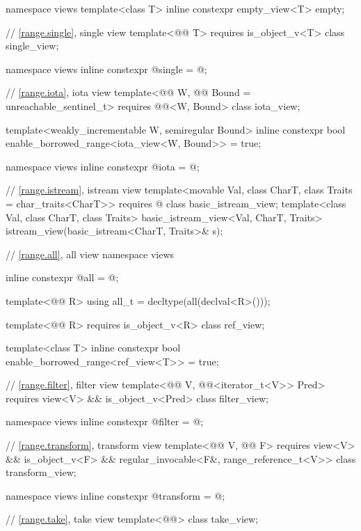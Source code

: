 \begin{codeblock}
{  namespace views {
    template<class T>
      inline constexpr empty_view<T> empty{};
  }

  // \ref{range.single}, single view
  template<@@ T>
    requires is_object_v<T>
  class single_view;

  namespace views { inline constexpr @\unspec@ single = @\unspec@; }

  // \ref{range.iota}, iota view
  template<@@ W, @@ Bound = unreachable_sentinel_t>
    requires @@<W, Bound>
  class iota_view;

  template<weakly_incrementable W, semiregular Bound>
    inline constexpr bool enable_borrowed_range<iota_view<W, Bound>> = true;

  namespace views { inline constexpr @\unspec@ iota = @\unspec@; }

  // \ref{range.istream}, istream view
  template<movable Val, class CharT, class Traits = char_traits<CharT>>
    requires @\seebelow@
  class basic_istream_view;
  template<class Val, class CharT, class Traits>
    basic_istream_view<Val, CharT, Traits> istream_view(basic_istream<CharT, Traits>& s);

  // \ref{range.all}, all view
  namespace views {
    inline constexpr @\unspec@ all = @\unspec@;

    template<@@ R>
      using all_t = decltype(all(declval<R>()));
  }

  template<@@ R>
    requires is_object_v<R>
  class ref_view;

  template<class T>
    inline constexpr bool enable_borrowed_range<ref_view<T>> = true;

  // \ref{range.filter}, filter view
  template<@@ V, @@<iterator_t<V>> Pred>
    requires view<V> && is_object_v<Pred>
  class filter_view;

  namespace views { inline constexpr @\unspec@ filter = @\unspec@; }

  // \ref{range.transform}, transform view
  template<@@ V, @@ F>
    requires view<V> && is_object_v<F> &&
             regular_invocable<F&, range_reference_t<V>>
  class transform_view;

  namespace views { inline constexpr @\unspec@ transform = @\unspec@; }

  // \ref{range.take}, take view
  template<@@> class take_view;

}
\end{codeblock}
